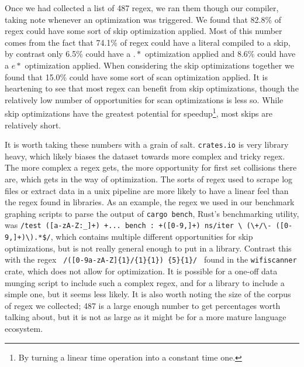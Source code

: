 Once we had collected
a list of 487 regex, we ran them though our compiler, taking
note whenever an optimization was triggered. We found that
82.8\% of regex could have some sort of skip optimization
applied. Most of this number comes from the fact that 74.1\% of
regex could have a literal compiled to a skip,
by contrast only 6.5\% could have a $.*$ optimization applied and 8.6\% could
have a $e*$ optimization applied. When considering the skip
optimizations together we found that 15.0\% could have some sort of
scan optimization applied. It is heartening to see that most regex
can benefit from skip optimizations, though the relatively low number
of opportunities for scan optimizations is less so. While skip
optimizations have the greatest potential for speedup\footnote{By turning
a linear time operation into a constant time one.}, most skips
are relatively short.

It is worth taking these numbers with a grain of salt. \verb'crates.io'
is very library heavy, which likely biases the dataset towards
more complex and tricky regex. The more complex a regex gets,
the more opportunity for first set collisions there are, which gets
in the way of optimization. The sorts
of regex used to scrape log files or extract data in a unix pipeline
are more likely to have a linear feel than the regex found in
libraries. As an example, the regex we used in our
benchmark graphing scripts to parse the output
of \texttt{cargo \allowbreak bench}, Rust's benchmarking utility, was
\texttt{/test \allowbreak([a-zA-Z:\_]+) \allowbreak +... bench\allowbreak
      : \allowbreak+([0-9,]+) \allowbreak ns/iter \textbackslash
      (\textbackslash+/\textbackslash- \allowbreak
      ([0-9,]+)\textbackslash).*\$/},
which contains multiple different opportunities for skip optimizations,
but is not really general enough to put in a library. Contrast this
with the regex
\texttt{
/([0-9a-zA-Z]\allowbreak\{1\}\allowbreak/\allowbreak
[0-9a-zA-Z]\{1\}\allowbreak[:]\allowbreak\{1\})
\{5\}\allowbreak[0-9a-zA-Z]\allowbreak[0-9a-zA-Z]
\allowbreak\{1\}/
}
found in the \verb'wifiscanner' crate, which does not allow for
optimization. It is possible for a one-off data munging script to include
such a complex regex, and for a library to include a simple one, but
it seems less likely. It is also worth noting the size of the corpus of
regex we collected; 487 is a large enough number to get 
percentages worth talking about, but it is not as large as it might
be for a more mature language ecosystem.

